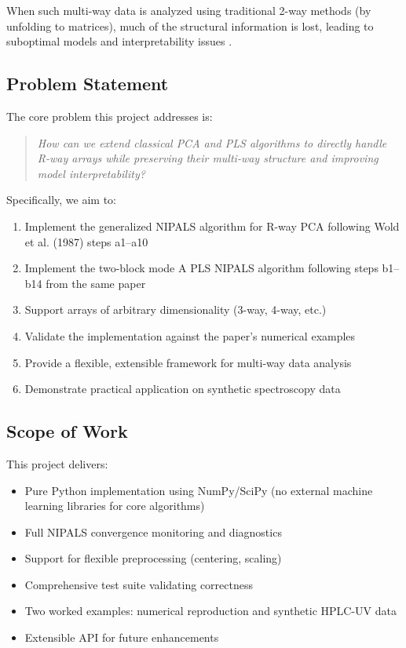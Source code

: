 \documentclass[12pt,a4paper]{article}
\begin{document}
When such multi-way data is analyzed using traditional 2-way methods (by unfolding to matrices), much of the structural information is lost, leading to suboptimal models and interpretability issues \citep{wold1987nonlinear}.

\subsection{Problem Statement}

The core problem this project addresses is:

\begin{quote}
\textit{How can we extend classical PCA and PLS algorithms to directly handle R-way arrays while preserving their multi-way structure and improving model interpretability?}
\end{quote}

Specifically, we aim to:

\begin{enumerate}
    \item Implement the generalized NIPALS algorithm for R-way PCA following Wold et al. (1987) steps a1--a10
    \item Implement the two-block mode A PLS NIPALS algorithm following steps b1--b14 from the same paper
    \item Support arrays of arbitrary dimensionality (3-way, 4-way, etc.)
    \item Validate the implementation against the paper's numerical examples
    \item Provide a flexible, extensible framework for multi-way data analysis
    \item Demonstrate practical application on synthetic spectroscopy data
\end{enumerate}

\subsection{Scope of Work}

This project delivers:
\begin{itemize}
    \item Pure Python implementation using NumPy/SciPy (no external machine learning libraries for core algorithms)
    \item Full NIPALS convergence monitoring and diagnostics
    \item Support for flexible preprocessing (centering, scaling)
    \item Comprehensive test suite validating correctness
    \item Two worked examples: numerical reproduction and synthetic HPLC-UV data
    \item Extensible API for future enhancements
\end{itemize}
\end{document}
